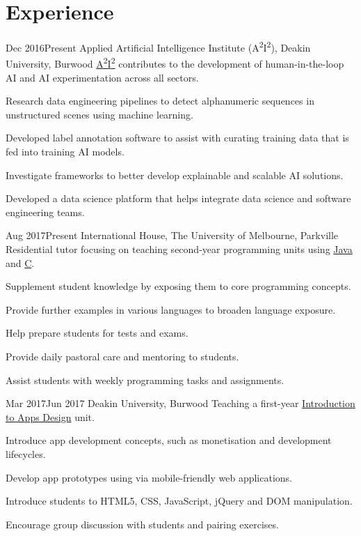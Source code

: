 \section{Experience}

\def \asis{A\textsuperscript{2}I\textsuperscript{2}}

{Dec 2016}{Present}
{Applied Artificial Intelligence Institute (\asis), Deakin University, Burwood}
{\href{http://a2i2.ai}{\asis} contributes to the development of human-in-the-loop AI and AI experimentation across all sectors.}
{
  \item Research data engineering pipelines to detect alphanumeric sequences in unstructured scenes using machine learning.
  \item Developed label annotation software to assist with curating training data that is fed into training AI models.
  \item Investigate frameworks to better develop explainable and scalable AI solutions.
  \item Developed a data science platform that helps integrate data science and software engineering teams.
}

{Aug 2017}{Present}
{International House, The University of Melbourne, Parkville}
{Residential tutor focusing on teaching second-year programming units using \href{https://handbook.unimelb.edu.au/2017/subjects/swen20003}{Java} and \href{https://handbook.unimelb.edu.au/2018/subjects/comp20005}{C}.}
{
  \item Supplement student knowledge by exposing them to core programming concepts.
  \item Provide further examples in various languages to broaden language exposure.
  \item Help prepare students for tests and exams.
  \item Provide daily pastoral care and mentoring to students.
  \item Assist students with weekly programming tasks and assignments.
}

{Mar 2017}{Jun 2017}
{Deakin University, Burwood}
{Teaching a first-year \href{http://www.deakin.edu.au/current-students-courses/unit.php?unit=SIT120}{Introduction to Apps Design} unit.}
{
  \item Introduce app development concepts, such as monetisation and development lifecycles.
  \item Develop app prototypes using via mobile-friendly web applications.
  \item Introduce students to HTML5, CSS, JavaScript, jQuery and DOM manipulation.
  \item Encourage group discussion with students and pairing exercises.
}

